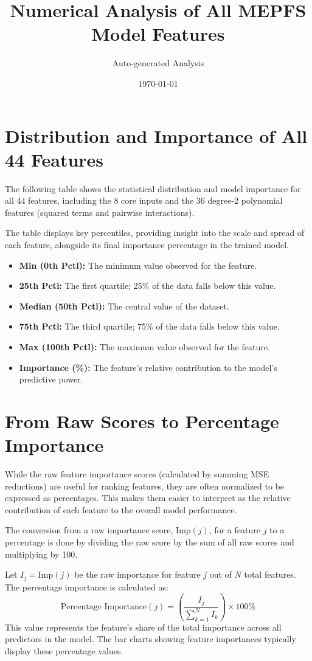 \documentclass[11pt]{article}
\title{Numerical Analysis of All MEPFS Model Features}
\author{Auto-generated Analysis}
\date{\today}
\begin{document}
\maketitle

\section*{Distribution and Importance of All 44 Features}
\label{sec:all_features}
The following table shows the statistical distribution and model importance for all 44 features, including the 8 core inputs and the 36 degree-2 polynomial features (squared terms and pairwise interactions).

The table displays key percentiles, providing insight into the scale and spread of each feature, alongside its final importance percentage in the trained model.
\begin{itemize}
    \item \textbf{Min (0th Pctl):} The minimum value observed for the feature.
    \item \textbf{25th Pctl:} The first quartile; 25\% of the data falls below this value.
    \item \textbf{Median (50th Pctl):} The central value of the dataset.
    \item \textbf{75th Pctl:} The third quartile; 75\% of the data falls below this value.
    \item \textbf{Max (100th Pctl):} The maximum value observed for the feature.
    \item \textbf{Importance (\%):} The feature's relative contribution to the model's predictive power.
\end{itemize}

\section*{From Raw Scores to Percentage Importance}
\label{sec:percentage_importance}
While the raw feature importance scores (calculated by summing MSE reductions) are useful for ranking features, they are often normalized to be expressed as percentages. This makes them easier to interpret as the relative contribution of each feature to the overall model performance.

The conversion from a raw importance score, $\mathrm{Imp}(j)$, for a feature $j$ to a percentage is done by dividing the raw score by the sum of all raw scores and multiplying by 100.

Let $I_j = \mathrm{Imp}(j)$ be the raw importance for feature $j$ out of $N$ total features. The percentage importance is calculated as:
\[
\text{Percentage Importance}(j) = \left( \frac{I_j}{\sum_{k=1}^{N} I_k} \right) \times 100\%
\]
This value represents the feature's share of the total importance across all predictors in the model. The bar charts showing feature importances typically display these percentage values.
\end{document}
